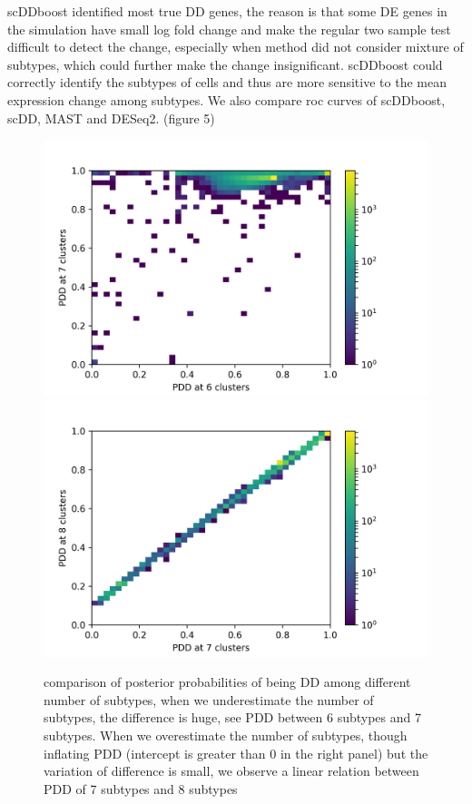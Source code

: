 \documentclass[11pt]{amsart}
\begin{document}
scDDboost identified most true DD genes, the reason is that some DE genes in the simulation have small log fold change and make the regular two sample test difficult to detect the change, especially when method did not consider mixture of subtypes, which could further make the change insignificant. scDDboost could correctly identify the subtypes of cells and thus are more sensitive to the mean expression change among subtypes. We also compare roc curves of scDDboost, scDD, MAST and DESeq2. (figure 5)
\begin{figure}[h]
\vspace{-\parskip}
  \includegraphics[width=\textwidth]{sim_67.png}
\endminipage\hfill
{}
  \includegraphics[width=\textwidth]{sim_78.png}
  \endminipage
\caption{comparison of posterior probabilities of being DD among different number of subtypes, when we underestimate the number of subtypes, the difference is huge, see PDD between 6 subtypes and 7 subtypes. When we overestimate the number of subtypes, though inflating PDD (intercept is greater than 0 in the right panel) but the variation of difference is small, we observe a linear relation between PDD of 7 subtypes and 8 subtypes}
\end{figure}
\end{document}
